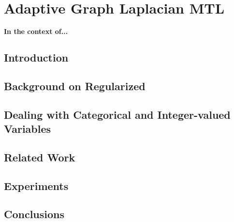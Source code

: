 
\chapter{Adaptive Graph Laplacian MTL} %
\label{Chapter6}

{\bf \small{
In the context of...
}}

\section{Introduction}


\section{Background on Regularized} 
\label{sec:back}


\section{Dealing with Categorical and Integer-valued Variables} \label{sec:dealing}



\section{Related Work} \label{sec:related}



\section{Experiments} \label{sec:experiments}



\section{Conclusions} \label{sec:conclusions}

